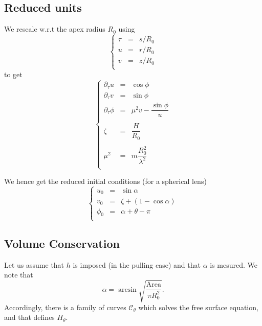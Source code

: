 \documentclass[aps,onecolumn]{revtex4}
\begin{document}
\subsection{Reduced units}
We rescale w.r.t the apex radius $R_0$ using
\begin{equation}
	\left\lbrace
	\begin{array}{rcl}
		\tau & = & s/R_0 \\
		 u   & = & r/R_0 \\
		 v   & = & z/R_0 \\
	\end{array}
	\right.
\end{equation}
to get
\begin{equation}
	\left\lbrace
	\begin{array}{rcl}
	\partial_\tau u & = & \cos\phi\\
	\partial_\tau v & = & \sin\phi\\
	\partial_\tau \phi & = &  \mu^2 v - \dfrac{\sin\phi}{u}\\
	\\
	\zeta              & = & \dfrac{H}{R_0}\\
	\\
	\mu^2                & = & m\dfrac{R_0^2}{\lambda^2}\\
	\end{array}
	\right.
\end{equation}

We hence get the reduced initial conditions (for a spherical lens)
\begin{equation}
\left\lbrace
\begin{array}{rcl}
	u_0    & = & \sin\alpha\\
	v_0    & = & \zeta + (1-\cos\alpha)\\
	\phi_0 & = & \alpha+\theta-\pi\\
\end{array}
\right.
\end{equation}

\subsection{Volume Conservation}
Let us assume that $h$ is imposed (in the pulling case) and that $\alpha$ is mesured.
We note that
\begin{equation}
	\alpha = \arcsin\sqrt{\dfrac{\mathrm{Area}}{\pi R_0^2}}.
\end{equation}
Accordingly, there is a family of curves $\mathcal{C}_\theta$ which solves the free surface equation,
and that defines $H_\theta$.
\end{document}

